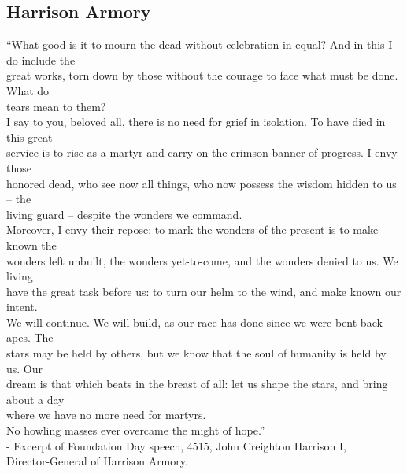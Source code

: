 \subsection{Harrison Armory}
\begin{loreQuote}
         “What good is it to mourn the dead without celebration in equal? And in this I do include the\\
         great works, torn down by those without the courage to face what must be done. What do\\
         tears mean to them?\\

         I say to you, beloved all, there is no need for grief in isolation. To have died in this great\\
         service is to rise as a martyr and carry on the crimson banner of progress. I envy those\\
         honored dead, who see now all things, who now possess the wisdom hidden to us -- the\\
         living guard -- despite the wonders we command.\\

         Moreover, I envy their repose: to mark the wonders of the present is to make known the\\
         wonders left unbuilt, the wonders yet-to-come, and the wonders denied to us. We living\\
         have the great task before us: to turn our helm to the wind, and make known our intent.\\

         We will continue. We will build, as our race has done since we were bent-back apes. The\\
         stars may be held by others, but we know that the soul of humanity is held by us. Our\\
         dream is that which beats in the breast of all: let us shape the stars, and bring about a day\\
         where we have no more need for martyrs.\\

         No howling masses ever overcame the might of hope.”\\

         \quad - Excerpt of Foundation Day speech, 4515, John Creighton Harrison I,\\
         \quad Director-General of Harrison Armory.
\end{loreQuote}

